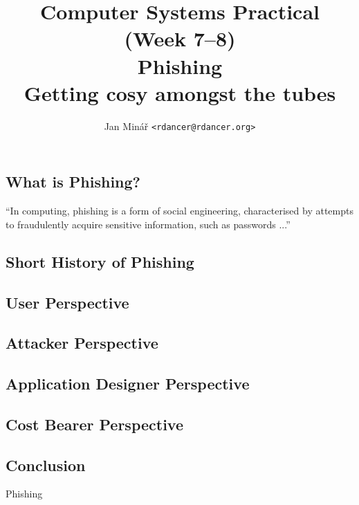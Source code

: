 \documentclass[10pt]{article}
\author{Jan Minář {\tt <rdancer@rdancer.org>}}
\title{Computer Systems Practical (Week 7--8)\\Phishing\\Getting cosy amongst the tubes}
\begin{document}
\maketitle

\subsection{What is Phishing?}
``In computing, phishing is a form of social engineering, characterised by attempts to fraudulently acquire sensitive information, such as passwords ...'' \cite{gwavanation:phishing-definition}

\subsection{Short History of Phishing}


\subsection{User Perspective}
\subsection{Attacker Perspective}
\subsection{Application Designer Perspective}
\subsection{Cost Bearer Perspective}
\subsection{Conclusion}

Phishing




\end{document}
